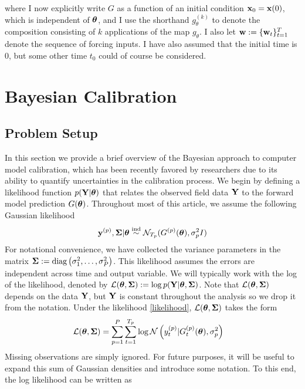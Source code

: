 \documentclass[12pt]{article}
\begin{document}
 where I now explicitly write $G$ as a function of an initial condition $\mathbf{x}_0 = \mathbf{x}(0)$, which is independent of $\boldsymbol{\theta}$, and I use the shorthand $g_\theta^{(k)}$ to denote 
 the composition consisting of $k$ applications of the map $g_\theta$. I also let $\mathbf{w} := \{\mathbf{w}_t\}_{t = 1}^{T}$ denote the sequence of forcing inputs. 
 I have also assumed that the initial time is $0$, but some other time $t_0$ could of course be considered. 

\section{Bayesian Calibration}

\subsection{Problem Setup}
In this section we provide a brief overview of the Bayesian approach to computer model calibration, which has been recently favored by researchers due to its ability to quantify 
uncertainties in the calibration process. We begin by defining a likelihood function $p(\mathbf{Y}|\boldsymbol{\theta})$ that relates the observed field data $\mathbf{Y}$ to the forward model prediction 
$G(\boldsymbol{\theta})$. Throughout most of this article, we assume the following Gaussian likelihood 
\begin{align}
\mathbf{y}^{(p)}, \boldsymbol{\Sigma} | \boldsymbol{\theta} \overset{\text{ind}}{\sim} \mathcal{N}_{T_{p}}(G^{(p)}(\boldsymbol{\theta}), \sigma_{p}^2 I) \label{likelihood}
\end{align}
For notational convenience, we have collected the 
variance parameters in the matrix $\boldsymbol{\Sigma} := \text{diag}\left(\sigma_1^2, \dots, \sigma_{P}^2 \right)$. 
This likelihood assumes the errors are independent across time and output variable. 
We will typically work with the log of the likelihood, denoted by 
$\mathcal{L}(\boldsymbol{\theta}, \boldsymbol{\Sigma}) := \log p(\mathbf{Y}|\boldsymbol{\theta}, \boldsymbol{\Sigma})$. Note that $\mathcal{L}(\boldsymbol{\theta}, \boldsymbol{\Sigma})$ depends on the data $\mathbf{Y}$, 
but $\mathbf{Y}$ is constant throughout the analysis so we drop it from the notation.
Under the likelihood \ref{likelihood}, $\mathcal{L}(\boldsymbol{\theta}, \boldsymbol{\Sigma})$ takes the form 
\begin{align*}
\mathcal{L}(\boldsymbol{\theta}, \boldsymbol{\Sigma}) &= \sum_{p = 1}^{P} \sum_{t = 1}^{T_{p}} \log \mathcal{N}\left(y_{t}^{(p)} | G_{t}^{(p)}(\boldsymbol{\theta}), \sigma_{p}^2 \right)
\end{align*}
Missing observations are simply ignored. For future purposes, it will be useful to expand this sum of Gaussian densities and introduce some notation. To this end, the log likelihood can be written as 
\end{document}

